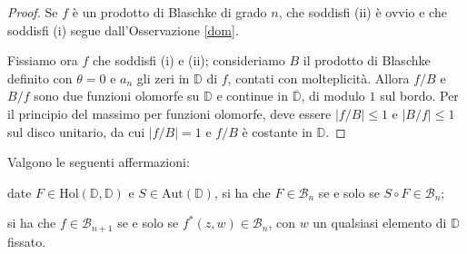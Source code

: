 \begin{proof}
  Se $f$ è un prodotto di Blaschke di grado $n$, che soddisfi (ii) è ovvio e che soddisfi (i) segue dall'Osservazione \ref{dom}.

  Fissiamo ora $f$ che soddisfi (i) e (ii); consideriamo $B$ il prodotto di Blaschke definito con $\theta=0$ e $a_n$ gli zeri in $\mathbb{D}$ di $f$, contati con molteplicità. Allora $f/B$ e $B/f$ sono due funzioni olomorfe su $\mathbb{D}$ e continue in $\overline{\mathbb{D}}$, di modulo $1$ sul bordo. Per il principio del massimo per funzioni olomorfe, deve essere $|f/B| \le 1$ e $|B/f| \le 1$ sul disco unitario, da cui $|f/B|=1$ e $f/B$ è costante in $\mathbb{D}$.
\end{proof}

\begin{prop} \label{blaschke-prop}
  Valgono le seguenti affermazioni:
  \begin{nlist}
    \item date $F \in \text{Hol}(\mathbb{D},\mathbb{D})$ e $S \in \text{Aut}(\mathbb{D})$, si ha che $F \in \mathcal{B}_n$ se e solo se $S\circ F \in \mathcal{B}_n$;
    \item si ha che $f \in \mathcal{B}_{n+1}$ se e solo se $f^*(z,w) \in \mathcal{B}_n$, con $w$ un qualsiasi elemento di $\mathbb{D}$ fissato.
  \end{nlist}
\end{prop}

